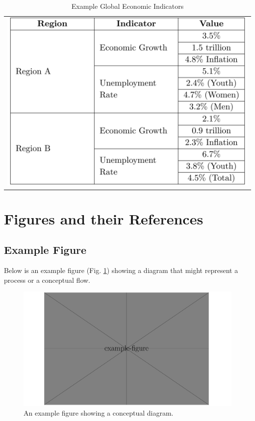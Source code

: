 \documentclass[a4paper]{article}
\begin{document}
\begin{table}[htbp]
    \centering
    \caption{Example Global Economic Indicators}
    \label{tab:tab_table3}
    \begin{tabular}{l}
    \includegraphics[width=\linewidth]{tab_table3.png}
    \end{tabular}
\end{table}


\section{Figures and their References}

\subsection{Example Figure}

Below is an example figure (Fig. \ref{multifig:multifig_examplefig}) showing a diagram that might represent a process or a conceptual flow.


\begin{figure}[htbp]
    \centering
    \includegraphics[width=\linewidth]{multifig_examplefig.png}
    \caption{
        An example figure showing a conceptual diagram.
    }
    \label{multifig:multifig_examplefig}
\end{figure}
\end{document}
